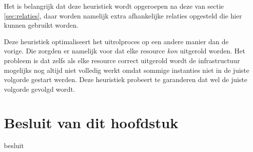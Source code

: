Het is belangrijk dat deze heuristiek wordt opgeroepen na deze van sectie \ref{sec:relaties}, daar worden namelijk extra afhankelijke relaties opgesteld die hier kunnen gebruikt worden.

Deze heuristiek optimaliseert het uitrolproces op een andere manier dan de vorige.
Die zorgden er namelijk voor dat elke resource \emph{kon} uitgerold worden.
Het probleem is dat zelfs als elke resource correct uitgerold wordt de infrastructuur mogelijks nog altijd niet volledig werkt omdat sommige instanties niet in de juiste volgorde gestart werden.
Deze heuristiek probeert te garanderen dat wel de juiste volgorde gevolgd wordt.

\section{Besluit van dit hoofdstuk}

besluit

